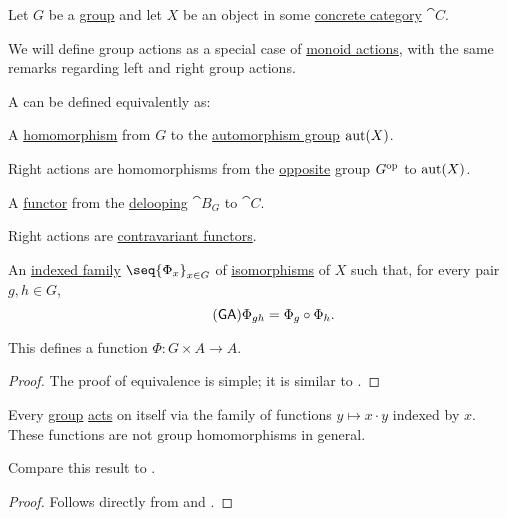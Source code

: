 \begin{definition}\label{def:group_action}
  Let \( G \) be a \hyperref[def:group]{group} and let \( X \) be an object in some \hyperref[def:concrete_category]{concrete category} \( \cat{C} \).

  We will define group actions as a special case of \hyperref[def:monoid_action]{monoid actions}, with the same remarks regarding left and right group actions.

  A  can be defined equivalently as:
  \begin{thmenum}
     A \hyperref[def:group/homomorphism]{homomorphism} from \( G \) to the \hyperref[def:automorphism_group]{automorphism group} \( \operatorname{aut}(X) \).

    Right actions are homomorphisms from the \hyperref[def:monoid/opposite]{opposite} group \( G^{\operatorname{op}} \) to \( \operatorname{aut}(X) \).

     A \hyperref[def:functor]{functor} from the \hyperref[def:monoid_delooping]{delooping} \( \cat{B}_G \) to \( \cat{C} \).

    Right actions are \hyperref[rem:contravariant_functor]{contravariant functors}.

     An \hyperref[def:cartesian_product/indexed_family]{indexed family} \( \seq{ \Phi_x }_{x \in G} \) of \hyperref[def:morphism_invertibility/isomorphism]{isomorphisms} of \( X \) such that, for every pair \( g, h \in G \),
    \begin{equation}\label{eq:def:group_action/family/compatibility}\tag{\logic{GA}}
      \Phi_{gh} = \Phi_g \bincirc \Phi_h.
    \end{equation}

    This defines a function \( \Phi: G \times A \to A \).
  \end{thmenum}
\end{definition}
\begin{proof}
  The proof of equivalence is simple; it is similar to .
\end{proof}

\begin{theorem}\label{thm:cayleys_theorem}
  Every \hyperref[def:group]{group} \hyperref[def:group_action]{acts} on itself via the family of functions \( y \mapsto x \cdot y \) indexed by \( x \). These functions are not group homomorphisms in general.

  Compare this result to .
\end{theorem}
\begin{proof}
  Follows directly from  and .
\end{proof}


